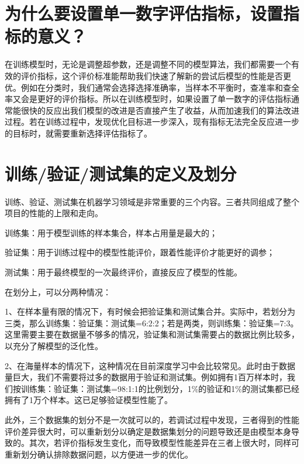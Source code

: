 \section{为什么要设置单一数字评估指标，设置指标的意义？}\label{ux4e3aux4ec0ux4e48ux8981ux8bbeux7f6eux5355ux4e00ux6570ux5b57ux8bc4ux4f30ux6307ux6807ux8bbeux7f6eux6307ux6807ux7684ux610fux4e49}

在训练模型时，无论是调整超参数，还是调整不同的模型算法，我们都需要一个有效的评价指标，这个评价标准能帮助我们快速了解新的尝试后模型的性能是否更优。例如在分类时，我们通常会选择选择准确率，当样本不平衡时，查准率和查全率又会是更好的评价指标。所以在训练模型时，如果设置了单一数字的评估指标通常能很快的反应出我们模型的改进是否直接产生了收益，从而加速我们的算法改进过程。若在训练过程中，发现优化目标进一步深入，现有指标无法完全反应进一步的目标时，就需要重新选择评估指标了。

\section{训练/验证/测试集的定义及划分}\label{ux8badux7ec3ux9a8cux8bc1ux6d4bux8bd5ux96c6ux7684ux5b9aux4e49ux53caux5212ux5206}

训练、验证、测试集在机器学习领域是非常重要的三个内容。三者共同组成了整个项目的性能的上限和走向。

训练集：用于模型训练的样本集合，样本占用量是最大的；

验证集：用于训练过程中的模型性能评价，跟着性能评价才能更好的调参；

测试集：用于最终模型的一次最终评价，直接反应了模型的性能。

在划分上，可以分两种情况：

1、在样本量有限的情况下，有时候会把验证集和测试集合并。实际中，若划分为三类，那么训练集：验证集：测试集=6:2:2；若是两类，则训练集：验证集=7:3。这里需要主要在数据量不够多的情况，验证集和测试集需要占的数据比例比较多，以充分了解模型的泛化性。

2、在海量样本的情况下，这种情况在目前深度学习中会比较常见。此时由于数据量巨大，我们不需要将过多的数据用于验证和测试集。例如拥有1百万样本时，我们按训练集：验证集：测试集=98:1:1的比例划分，1\%的验证和1\%的测试集都已经拥有了1万个样本。这已足够验证模型性能了。

此外，三个数据集的划分不是一次就可以的，若调试过程中发现，三者得到的性能评价差异很大时，可以重新划分以确定是数据集划分的问题导致还是由模型本身导致的。其次，若评价指标发生变化，而导致模型性能差异在三者上很大时，同样可重新划分确认排除数据问题，以方便进一步的优化。

